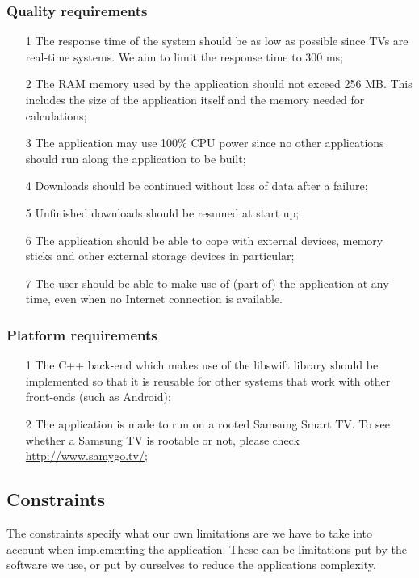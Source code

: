 \subsubsection{Quality requirements} 
\begin{itemize}
\item[1] The response time of the system should be as low as possible since TVs are real-time systems. We aim to limit the response time to 300 ms;
\item[2] The RAM memory used by the application should not exceed 256 MB. This includes the size of the application itself and the memory needed for calculations;
\item[3] The application may use 100\% CPU power since no other applications should run along the application to be built;
\item[4] Downloads should be continued without loss of data after a failure;
\item[5] Unfinished downloads should be resumed at start up;
\item[6] The application should be able to cope with external devices, memory sticks and other external storage devices in particular;
\item[7] The user should be able to make use of (part of) the application at any time, even when no Internet connection is available.  
\end{itemize} 

\subsubsection{Platform requirements}
\begin{itemize}
\item[1] The C++ back-end which makes use of the libswift library should be implemented so that it is reusable for other systems that work with other front-ends (such as Android);
\item[2] The application is made to run on a rooted Samsung Smart TV. To see whether a Samsung TV is rootable or not, please check \url{http://www.samygo.tv/};
\end{itemize}

\subsection{Constraints}
The constraints specify what our own limitations are we have to take into account when implementing the application. These can be limitations put by the software we use, or put by ourselves to reduce the application\textquotesingle s complexity.

